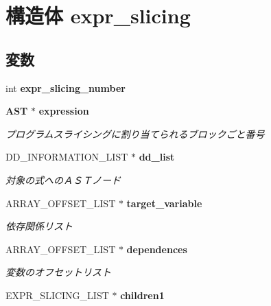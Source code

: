 \section{構造体 expr\_\-slicing}
\label{structexpr__slicing}
\subsection*{変数}
\begin{DoxyCompactItemize}
\item 
int {\bfseries expr\_\-slicing\_\-number}\label{structexpr__slicing_ab5e11840ad619b346ef918e7ae1e4192}

\item 
{\bf AST} $\ast$ {\bf expression}\label{structexpr__slicing_aedba8cfc4257b061cb957627eaa20aa8}

\begin{DoxyCompactList}\small\item\em プログラムスライシングに割り当てられるブロックごと番号 \item\end{DoxyCompactList}\item 
DD\_\-INFORMATION\_\-LIST $\ast$ {\bf dd\_\-list}\label{structexpr__slicing_a6dd34be5ebc821a1981200b3fc99fcce}

\begin{DoxyCompactList}\small\item\em 対象の式へのＡＳＴノード \item\end{DoxyCompactList}\item 
ARRAY\_\-OFFSET\_\-LIST $\ast$ {\bf target\_\-variable}\label{structexpr__slicing_a81a6f2ff6b7d5bf71e74aec0bcc3d9c2}

\begin{DoxyCompactList}\small\item\em 依存関係リスト \item\end{DoxyCompactList}\item 
ARRAY\_\-OFFSET\_\-LIST $\ast$ {\bf dependences}\label{structexpr__slicing_a5b27eb7962b631a4f7b97886139d63bb}

\begin{DoxyCompactList}\small\item\em 変数のオフセットリスト \item\end{DoxyCompactList}\item 
EXPR\_\-SLICING\_\-LIST $\ast$ {\bf children1}\label{structexpr__slicing_acbcce12cd076171078fd8c1cd5c04edc}


\end{DoxyCompactItemize}
